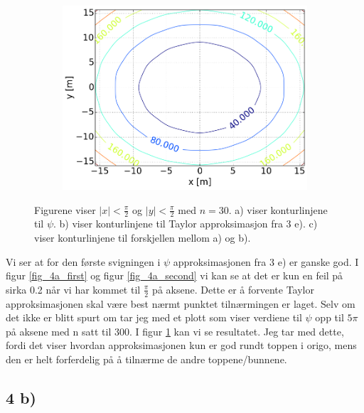 \begin{figure}[H]
\begin{subfigure}{0.3\textwidth}
        \includegraphics[width=\linewidth]{../4a_2_5_300.png}
        \caption{}
    \end{subfigure}
    \caption{Figurene viser $|x| < \frac{\pi}{2}$ og
    $|y| < \frac{\pi}{2}$ med $n = 30$. \color{blue} a) \color{black}
     viser konturlinjene til $\psi$. \color{blue} b)\color{black} viser
     konturlinjene til Taylor approksimasjon
    fra 3 e). \color{blue} c) \color{black} viser konturlinjene til forskjellen mellom a) og b).}
    \label{fig_4a_third}
\end{figure}

Vi ser at for den første svigningen i $\psi$ approksimasjonen fra
3 e) er ganske god. I figur \ref{fig_4a_first} og figur \ref{fig_4a_second}
vi kan se at det er kun en feil på sirka 0.2 når vi har
kommet til $\frac{\pi}{2}$ på aksene. Dette er å
forvente Taylor approksimasjonen skal være best nærmt
punktet tilnærmingen er laget. Selv om det ikke er blitt spurt om tar
jeg med et plott som viser verdiene til $\psi$ opp til $ 5 \pi $ på aksene
med n satt til 300. I figur \ref{fig_4a_third} kan vi se resultatet.
Jeg tar med dette, fordi det viser hvordan approksimasjonen kun er god rundt
toppen i origo, mens den er helt forferdelig på å tilnærme de andre toppene/bunnene.













\subsection*{4 b)}


